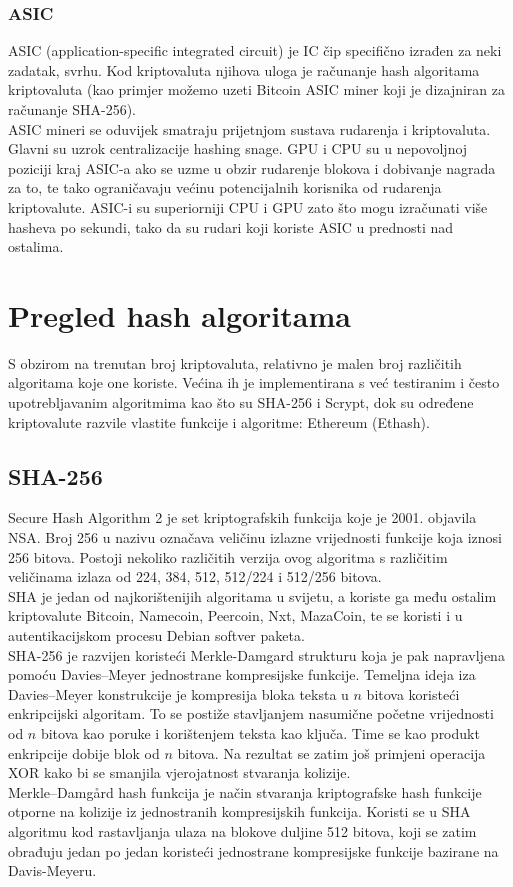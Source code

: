 \documentclass[12pt]{article}
\begin{document}
\subsubsection{ASIC}
ASIC (application-specific integrated circuit) je IC čip specifično izrađen za neki zadatak, svrhu. Kod kriptovaluta njihova uloga je računanje hash algoritama kriptovaluta (kao primjer možemo uzeti Bitcoin ASIC miner koji je dizajniran za računanje SHA-256). \\
ASIC mineri se oduvijek smatraju prijetnjom sustava rudarenja i kriptovaluta. Glavni su uzrok centralizacije hashing snage. GPU i CPU su u nepovoljnoj poziciji kraj ASIC-a ako se uzme u obzir rudarenje blokova i dobivanje nagrada za to, te tako ograničavaju većinu potencijalnih korisnika od rudarenja kriptovalute. 
ASIC-i su superiorniji CPU i GPU zato što mogu izračunati više hasheva po sekundi, tako da su rudari koji koriste ASIC u prednosti nad ostalima.\cite{asic}\\

\pagebreak
\section{Pregled hash algoritama}
S obzirom na trenutan broj kriptovaluta, relativno je malen broj različitih algoritama koje one koriste. Većina ih je implementirana s već testiranim i često upotrebljavanim algoritmima kao što su SHA-256 i Scrypt, dok su određene kriptovalute razvile vlastite funkcije i algoritme: Ethereum (Ethash).


\subsection{SHA-256}
Secure Hash Algorithm 2 je set kriptografskih funkcija koje je 2001. objavila NSA. Broj 256 u nazivu označava veličinu izlazne vrijednosti funkcije koja iznosi 256 bitova. Postoji nekoliko različitih verzija ovog algoritma s različitim veličinama izlaza od 224, 384, 512, 512/224 i 512/256 bitova. \\
SHA je jedan od najkorištenijih algoritama u svijetu, a koriste ga među ostalim kriptovalute Bitcoin, Namecoin, Peercoin, Nxt, MazaCoin, te se koristi i u autentikacijskom procesu Debian softver paketa. \\

SHA-256 je razvijen koristeći Merkle-Damgard strukturu koja je pak napravljena pomoću Davies–Meyer jednostrane kompresijske funkcije. Temeljna ideja iza Davies–Meyer konstrukcije je kompresija bloka teksta u $n$ bitova koristeći enkripcijski algoritam. To se postiže stavljanjem nasumične početne vrijednosti od $n$ bitova kao poruke i korištenjem teksta kao ključa. Time se kao produkt enkripcije dobije blok od $n$ bitova. Na rezultat se zatim još primjeni operacija XOR kako bi se smanjila vjerojatnost stvaranja kolizije. \\
Merkle–Damgård hash funkcija je način stvaranja kriptografske hash funkcije otporne na kolizije iz jednostranih kompresijskih funkcija. Koristi se u SHA algoritmu kod rastavljanja ulaza na blokove duljine 512 bitova, koji se zatim obrađuju jedan po jedan koristeći jednostrane kompresijske funkcije bazirane na Davis-Meyeru.
\end{document}
